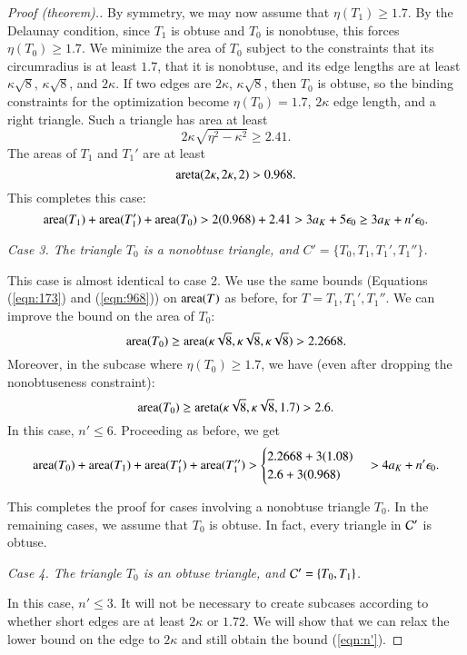 \begin{proof}[Proof (theorem).]
By symmetry, we may now assume that $\eta(T_1) \ge 1.7$.  By the
Delaunay condition, since $T_1$ is obtuse and $T_0$ is nonobtuse, this
forces $\eta(T_0)\ge 1.7$.  We minimize the area of $T_0$ subject to
the constraints that its circumradius is at least $1.7$, that it is
nonobtuse, and its edge lengths are at least $\kappa\sqrt{8}$,
$\kappa\sqrt{8}$, and $2\kappa$.  If two edges are $2\kappa$,
$\kappa\sqrt{8}$, then $T_0$ is obtuse, so the binding constraints for
the optimization become $\eta(T_0)=1.7$, $2\kappa$ edge length, and a
right triangle.  Such a triangle has area at least 
\[
2\kappa\sqrt{\eta^2 - \kappa^2} \ge 2.41.
\]  
The areas of $T_1$ and $T_1'$ are at least
\begin{equation}\label{eqn:968}
{\operatorname{areta}}(2\kappa,2\kappa,2) > 0.968.
\end{equation}
This completes this case:
\[
{\operatorname{area}}(T_1) + {\operatorname{area}}(T_1') + {\operatorname{area}}(T_0) 
>
2(0.968) + 2.41 > 3a_K + 5 \epsilon_0 \ge 3a_K + n'\epsilon_0.
\] %

{\it Case 3. The triangle $T_0$ is a nonobtuse triangle, and $C'=\{T_0,T_1,T_1',T_1''\}$.}

This case is almost identical to case 2.  We use the same bounds
(Equations (\ref{eqn:173}) and (\ref{eqn:968})) on ${\operatorname{area}}(T)$ as
before, for $T = T_1, T_1', T_1''$.  We can improve the bound on the
area of $T_0$:
\[
{\operatorname{area}}(T_0) \ge {\operatorname{area}}(\kappa\sqrt{8},\kappa\sqrt{8},\kappa\sqrt{8}) > 2.2668.
\]
Moreover, in the subcase where $\eta(T_0)\ge 1.7$, we have
(even after dropping the nonobtuseness constraint):
\[
{\operatorname{area}}(T_0) \ge {\operatorname{areta}}(\kappa\sqrt{8},\kappa\sqrt{8},1.7) > 2.6.
\]
In this case, $n'\le 6$.  Proceeding as before, we get
\[
{\operatorname{area}}(T_0)  + {\operatorname{area}}(T_1) + {\operatorname{area}}(T_1') + {\operatorname{area}}(T_1'') > 
\begin{cases}
2.2668 + 3 (1.08) \\
2.6 + 3(0.968)
\end{cases}
> 4a_K + n' \epsilon_0.
\] %


This completes the proof for cases involving a nonobtuse triangle
$T_0$.  In the remaining cases, we assume that $T_0$ is obtuse.  In
fact, every triangle in $\mathcal C'$ is obtuse.

{\it Case 4. The triangle $T_0$ is an obtuse triangle, and $\mathcal C'=\{T_0,T_1\}$.}  

In this case, $n'\le 3$.  It will not be necessary to create subcases
according to whether short edges are at least $2\kappa$ or $1.72$.  We
will show that we can relax the lower bound on the edge to $2\kappa$
and still obtain the bound (\ref{eqn:n'}).


\end{proof}
